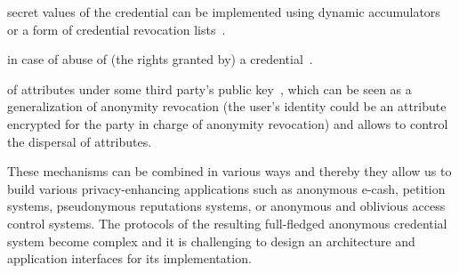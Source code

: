 {\begin{description}
secret values of the credential can be implemented using dynamic 
accumulators~\cite{cakoso09,camlys04} or
a form of credential revocation lists~\cite{bonsha04,brdede07,nfhf09}.
\item[\normalfont\emph{Revocation of anonymity}\hspace{-.5ex}] in case of abuse of (the 
rights granted by) a credential~\cite{camlys01a}.
\item[\normalfont\emph{Verifiable encryption}\hspace{-.5ex}] of attributes under some 
third party's public key~\cite{camsho02}, which 
can be seen as a generalization of anonymity revocation (the user's identity could be an 
attribute encrypted for the party in charge of anonymity revocation) and allows to 
control the dispersal of attributes.
\end{description}
These mechanisms can be combined in various ways and thereby they allow us
to build various privacy-enhancing applications such as anonymous e-cash, petition
systems, pseudonymous reputations systems, or anonymous and oblivious access control 
systems. 
The protocols of the resulting full-fledged anonymous credential system become complex
and it is challenging to design an architecture and application interfaces for
its implementation.
}

